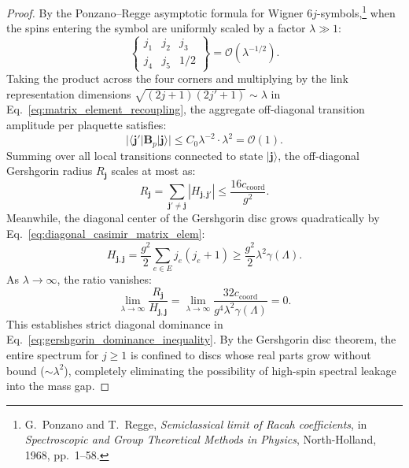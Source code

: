 \documentclass[11pt,reqno]{article}
\begin{document}
\begin{proof}
By the Ponzano--Regge asymptotic formula for Wigner $6j$-symbols,\footnote{G.~Ponzano and T.~Regge, \emph{Semiclassical limit of Racah coefficients}, in \emph{Spectroscopic and Group Theoretical Methods in Physics}, North-Holland, 1968, pp.~1--58.} when the spins entering the symbol are uniformly scaled by a factor $\lambda \gg 1$:
\begin{equation}
    \label{eq:ponzano_regge_decay}
    \begin{Bmatrix} j_1 & j_2 & j_3 \\ j_4 & j_5 & 1/2 \end{Bmatrix} = \mathcal{O}\left( \lambda^{-1/2} \right).
\end{equation}
Taking the product across the four corners and multiplying by the link representation dimensions $\sqrt{(2j+1)(2j'+1)} \sim \lambda$ in Eq.~\eqref{eq:matrix_element_recoupling}, the aggregate off-diagonal transition amplitude per plaquette satisfies:
\begin{equation}
    \label{eq:plaquette_amplitude_scaling}
    |\langle \mathbf{j}' | \mathbf{B}_p | \mathbf{j} \rangle| \le C_0 \lambda^{-2} \cdot \lambda^2 = \mathcal{O}(1).
\end{equation}
Summing over all local transitions connected to state $|\mathbf{j}\rangle$, the off-diagonal Gershgorin radius $R_{\mathbf{j}}$ scales at most as:
\begin{equation}
    \label{eq:gershgorin_radius_bound}
    R_{\mathbf{j}} = \sum_{\mathbf{j}' \neq \mathbf{j}} |H_{\mathbf{j}, \mathbf{j}'}| \le \frac{16 c_{\mathrm{coord}}}{g^2}.
\end{equation}
Meanwhile, the diagonal center of the Gershgorin disc grows quadratically by Eq.~\eqref{eq:diagonal_casimir_matrix_elem}:
\begin{equation}
    \label{eq:gershgorin_center_growth}
    H_{\mathbf{j}, \mathbf{j}} = \frac{g^2}{2} \sum_{e \in E} j_e(j_e + 1) \ge \frac{g^2}{2} \lambda^2 \gamma(\Lambda).
\end{equation}
As $\lambda \to \infty$, the ratio vanishes:
\begin{equation}
    \label{eq:gershgorin_ratio_limit}
    \lim_{\lambda \to \infty} \frac{R_{\mathbf{j}}}{H_{\mathbf{j}, \mathbf{j}}} = \lim_{\lambda \to \infty} \frac{32 c_{\mathrm{coord}}}{g^4 \lambda^2 \gamma(\Lambda)} = 0.
\end{equation}
This establishes strict diagonal dominance in Eq.~\eqref{eq:gershgorin_dominance_inequality}. By the Gershgorin disc theorem, the entire spectrum for $j \ge 1$ is confined to discs whose real parts grow without bound ($\sim \lambda^2$), completely eliminating the possibility of high-spin spectral leakage into the mass gap.
\end{proof}
\end{document}
